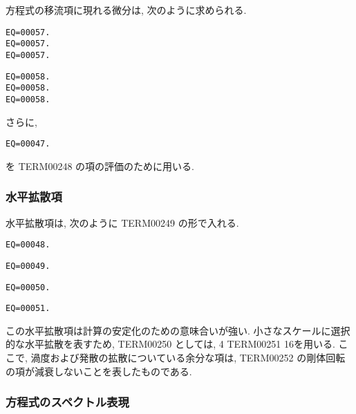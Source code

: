 方程式の移流項に現れる微分は,
次のように求められる.
%
\begin{verbatim}
EQ=00057.
EQ=00057.
EQ=00057.
\end{verbatim}
%
\begin{verbatim}
EQ=00058.
EQ=00058.
EQ=00058.
\end{verbatim}
%
さらに,
\begin{verbatim}
EQ=00047.
\end{verbatim}
を TERM00248 の項の評価のために用いる.

\subsubsection{水平拡散項}

水平拡散項は, 次のように TERM00249 の形で入れる.
%
\begin{verbatim}
EQ=00048.
\end{verbatim}
%
\begin{verbatim}
EQ=00049.
\end{verbatim}
%
\begin{verbatim}
EQ=00050.
\end{verbatim}
%
\begin{verbatim}
EQ=00051.
\end{verbatim}
%
この水平拡散項は計算の安定化のための意味合いが強い.
小さなスケールに選択的な水平拡散を表すため,
TERM00250 としては, 4 TERM00251 16を用いる.
ここで, 渦度および発散の拡散についている余分な項は,
TERM00252 の剛体回転の項が減衰しないことを表したものである.

\subsubsection{方程式のスペクトル表現}


